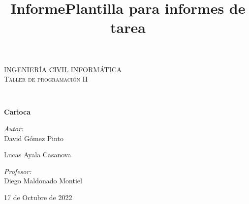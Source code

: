 \documentclass[60pt]{article}
\title{Informe}
\title{Plantilla para informes de tarea}
\newcommand{\depto}{Ingeniería Civil Informática}
\newcommand{\class}{Taller de programación II}
\newcommand{\Title}{Carioca}
\newcommand{\Author}{
David Gómez Pinto

Lucas Ayala Casanova}
\newcommand{\teacher}{Diego Maldonado Montiel}
\newcommand{\Date}{17 de Octubre de 2022}
\begin{document}
\thispagestyle{mytitlepagestyle}
\thispagestyle{mytitlepagestyle}
\noindent
\begin{center}

    \vspace*{0.8cm}

    \begin{minipage}{0.9\textwidth}
        \begin{center}
            \textsc{\huge \uppercase{\depto}}\\[0.5cm]
            \textsc{\Large \class}\\[1.5cm]
        \end{center}
    \end{minipage}\\[0.5cm]

    \vspace*{\fill}


    { \Huge \bfseries \Title}\\[0.4cm]

    \vspace*{\fill}

    \begin{minipage}{0.46\textwidth}
        \begin{flushleft} \large
            \emph{Autor:}\\
            \Author\\

        \end{flushleft}
    \end{minipage}

    \begin{minipage}{0.52\textwidth}
        \vspace{-0.6cm}
        \begin{flushright} \large
            \emph{Profesor:} \\
            \teacher\\
        \end{flushright}
    \end{minipage}
    \vspace*{1cm}
    \vspace*{\fill}
    \begin{center}
        {\large \Date}
    \end{center}
\end{center}

\newpage
\pagestyle{mypagestyle}
\tableofcontents
\end{document}
